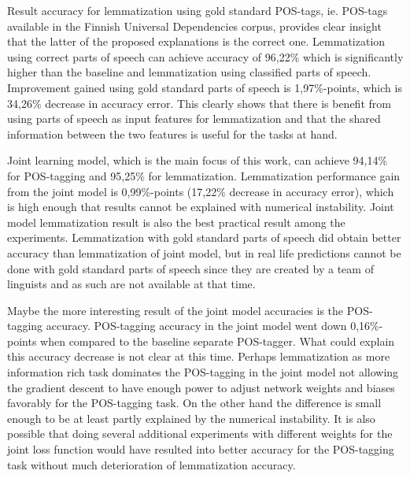 \documentclass[12pt,a4paper,english
]{tutthesis}
\begin{document}
Result accuracy for lemmatization using gold standard POS-tags, ie. POS-tags available in the Finnish Universal Dependencies corpus, provides clear insight that the latter of the proposed explanations is the correct one. Lemmatization using correct parts of speech can achieve accuracy of 96,22\% which is significantly higher than the baseline and lemmatization using classified parts of speech. Improvement gained using gold standard parts of speech is 1,97\%-points, which is 34,26\% decrease in accuracy error. This clearly shows that there is benefit from using parts of speech as input features for lemmatization and that the shared information between the two features is useful for the tasks at hand.

Joint learning model, which is the main focus of this work, can achieve 94,14\% for POS-tagging and 95,25\% for lemmatization. Lemmatization performance gain from the joint model is 0,99\%-points (17,22\% decrease in accuracy error), which is high enough that results cannot be explained with numerical instability. Joint model lemmatization result is also the best practical result among the experiments. Lemmatization with gold standard parts of speech did obtain better accuracy than lemmatization of joint model, but in real life predictions cannot be done with gold standard parts of speech since they are created by a team of linguists and as such are not available at that time.

Maybe the more interesting result of the joint model accuracies is the POS-tagging accuracy. POS-tagging accuracy in the joint model went down 0,16\%-points when compared to the baseline separate POS-tagger. What could explain this accuracy decrease is not clear at this time. Perhaps lemmatization as more information rich task dominates the POS-tagging in the joint model not allowing the gradient descent to have enough power to adjust network weights and biases favorably for the POS-tagging task. On the other hand the difference is small enough to be at least partly explained by the numerical instability. It is also possible that doing several additional experiments with different weights for the joint loss function would have resulted into better accuracy for the POS-tagging task without much deterioration of lemmatization accuracy.
\end{document}
